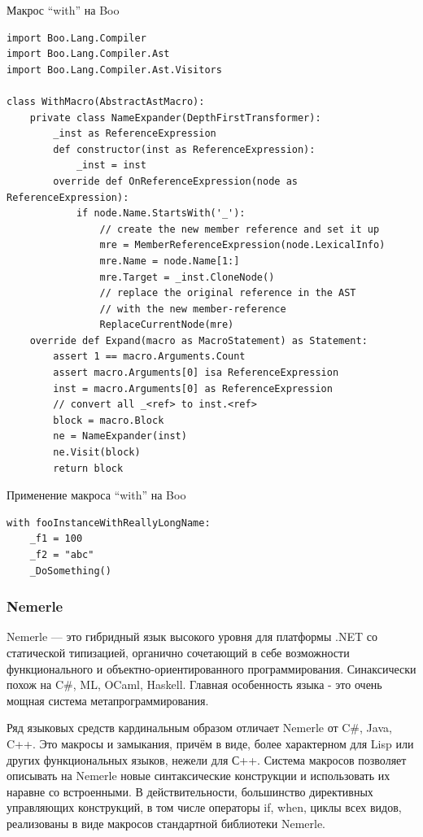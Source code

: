 \documentclass[a4paper,12pt]{article}
\begin{document}
\begin{example}
Макрос ``with'' на Boo
\end{example}
\begin{verbatim}
import Boo.Lang.Compiler
import Boo.Lang.Compiler.Ast
import Boo.Lang.Compiler.Ast.Visitors

class WithMacro(AbstractAstMacro):
    private class NameExpander(DepthFirstTransformer):
        _inst as ReferenceExpression
        def constructor(inst as ReferenceExpression):
            _inst = inst
        override def OnReferenceExpression(node as ReferenceExpression):
            if node.Name.StartsWith('_'):
                // create the new member reference and set it up
                mre = MemberReferenceExpression(node.LexicalInfo)
                mre.Name = node.Name[1:]
                mre.Target = _inst.CloneNode()
                // replace the original reference in the AST
                // with the new member-reference
                ReplaceCurrentNode(mre)
    override def Expand(macro as MacroStatement) as Statement:
        assert 1 == macro.Arguments.Count
        assert macro.Arguments[0] isa ReferenceExpression
        inst = macro.Arguments[0] as ReferenceExpression
        // convert all _<ref> to inst.<ref>
        block = macro.Block
        ne = NameExpander(inst)
        ne.Visit(block)
        return block
\end{verbatim}
\begin{example}
Применение макроса ``with'' на Boo
\end{example}
\begin{verbatim}
with fooInstanceWithReallyLongName:
    _f1 = 100
    _f2 = "abc"
    _DoSomething()
\end{verbatim}

\subsubsection{Nemerle}
Nemerle — это гибридный язык высокого уровня для платформы .NET со статической
типизацией, органично сочетающий в себе возможности функционального и
объектно-ориентированного программирования. Синаксически похож на C\#, ML,
OCaml, Haskell. Главная особенность языка - это очень мощная система
метапрограммирования.

Ряд языковых средств кардинальным образом отличает Nemerle от C\#, Java, C++.
Это макросы и замыкания, причём в виде, более характерном для Lisp или других
функциональных языков, нежели для С++. Система макросов позволяет описывать на
Nemerle новые синтаксические конструкции и использовать их наравне со
встроенными. В действительности, большинство директивных управляющих
конструкций, в том числе операторы if, when, циклы всех видов, реализованы в
виде макросов стандартной библиотеки Nemerle.
\end{document}
